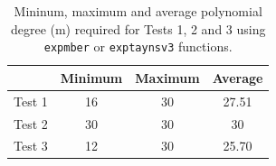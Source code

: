 \documentclass[preprint,10pt,numbers,sort&compress]{elsarticle}
\begin{document}
\begin{table}[!t]\begin{center}
        \caption{Mininum, maximum and average polynomial degree (m) required for Tests 1, 2 and 3 using \texttt{expmber} or \texttt{exptaynsv3} functions.}
{\footnotesize
        \begin{tabular}{|c||c|c|c|}\hline & Minimum & Maximum & Average \\\hline
            Test 1 & 16 & 30 & 27.51 \\\hline
            Test 2 & 30 & 30 & 30 \\\hline
            Test 3 & 12 & 30 & 25.70 \\\hline
        \end{tabular}}
        \label{table_m_comparative}
    \end{center}
\end{table} 
\end{document}
